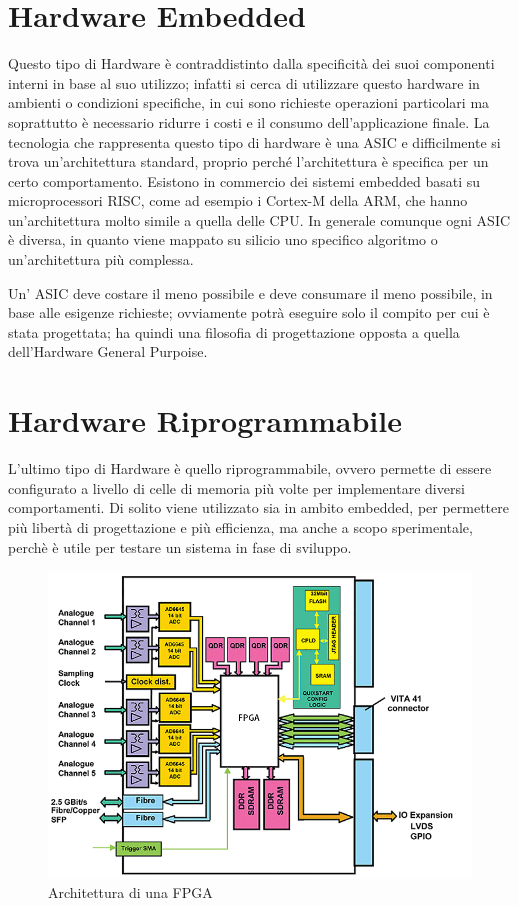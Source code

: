 \documentclass[a4paper,titlepage]{book}
\begin{document}
\section{Hardware Embedded}
Questo tipo di Hardware è contraddistinto dalla specificità dei suoi componenti interni in base al suo utilizzo; infatti si cerca di utilizzare questo hardware in ambienti o condizioni specifiche, in cui sono richieste operazioni particolari ma soprattutto è necessario ridurre i costi e il consumo dell'applicazione finale.
La tecnologia che rappresenta questo tipo di hardware è una ASIC e difficilmente si trova un'architettura standard, proprio perché l'architettura è specifica per un certo comportamento. Esistono in commercio dei sistemi embedded basati su microprocessori RISC, come ad esempio i Cortex-M della ARM, che hanno un'architettura molto simile a quella delle CPU. In generale comunque ogni ASIC è diversa, in quanto viene mappato su silicio uno specifico algoritmo o un'architettura più complessa.

Un' ASIC deve costare il meno possibile e deve consumare il meno possibile, in base alle esigenze richieste; ovviamente potrà eseguire solo il compito per cui è stata progettata; ha quindi una filosofia di progettazione opposta a quella dell'Hardware General Purpoise.

\section{Hardware Riprogrammabile}
L'ultimo tipo di Hardware è quello riprogrammabile, ovvero permette di essere configurato a livello di celle di memoria più volte per implementare diversi comportamenti. Di solito viene utilizzato sia in ambito embedded, per permettere più libertà di progettazione e più efficienza, ma anche a scopo sperimentale, perchè è utile per testare un sistema in fase di sviluppo.

\begin{figure}
\centering
\includegraphics[scale=0.6]{fpga.png}
\caption{Architettura di una FPGA}\label{fig:00}
\end{figure}
\end{document}
